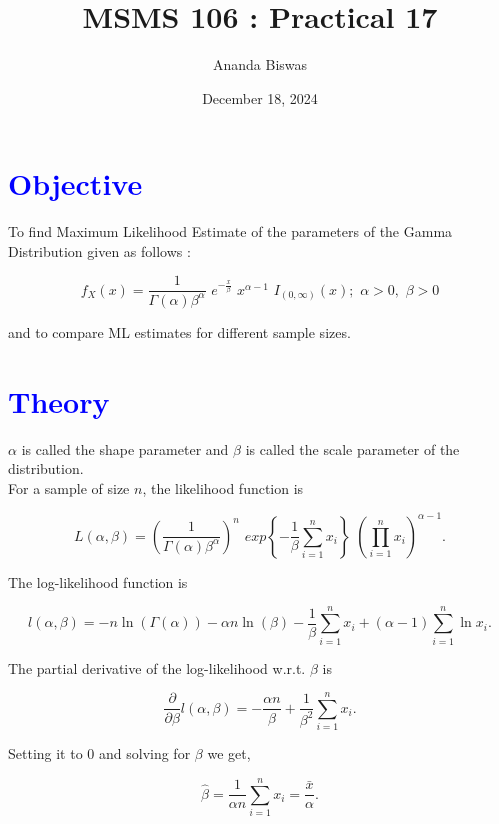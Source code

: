 \documentclass[11pt, a4paper]{article}\usepackage[]{graphicx}\usepackage[]{xcolor}
\title{MSMS 106 : Practical 17}
\author{Ananda Biswas}
\date{December 18, 2024}
\begin{document}
\maketitle


\section*{\faArrowAltCircleRight[regular] \textcolor{blue}{Objective}}

\hspace{1cm} To find Maximum Likelihood Estimate of the parameters of the Gamma Distribution given as follows :

$$f_X (x) = \dfrac{1}{\Gamma(\alpha) \beta^\alpha} \,\, e^{-\frac{x}{\beta}} \,\, x^{\alpha - 1} \,\, I_{(0, \infty)}(x); \,\, \alpha > 0, \,\, \beta > 0 $$

and to compare ML estimates for different sample sizes. 



\section*{\faArrowAltCircleRight[regular] \textcolor{blue}{Theory}}

$\alpha$ is called the shape parameter and $\beta$ is called the scale parameter of the distribution. \\

For a sample of size $n$, the likelihood function is 

$$L(\alpha, \beta) = \left( \dfrac{1}{\Gamma(\alpha) \beta^\alpha} \right)^{n} \,\, exp \left\{-\dfrac{1}{\beta}\sum \limits_{i = 1}^{n} x_i \right\} \,\, \left( \prod \limits_{i = 1}^{n} x_i \right)^{\alpha - 1}. $$


The log-likelihood function is 

$$ l(\alpha, \beta) = -n \ln(\Gamma(\alpha)) - \alpha n \ln(\beta) - \dfrac{1}{\beta}\sum \limits_{i = 1}^{n} x_i + ({\alpha - 1}) \sum \limits_{i = 1}^{n} \ln x_i .$$

The partial derivative of the log-likelihood w.r.t. $\beta$ is

$$ \dfrac{\partial}{\partial \beta} l(\alpha, \beta) = - \dfrac{\alpha n}{\beta} + \dfrac{1}{\beta^2}\sum \limits_{i = 1}^{n} x_i . $$

Setting it to $0$ and solving for $\beta$ we get,

\begin{equation}
\hat{\beta} =  \dfrac{1}{\alpha n}\sum \limits_{i = 1}^{n} x_i = \dfrac{\bar{x}}{\alpha}.
\end{equation}
\end{document}
